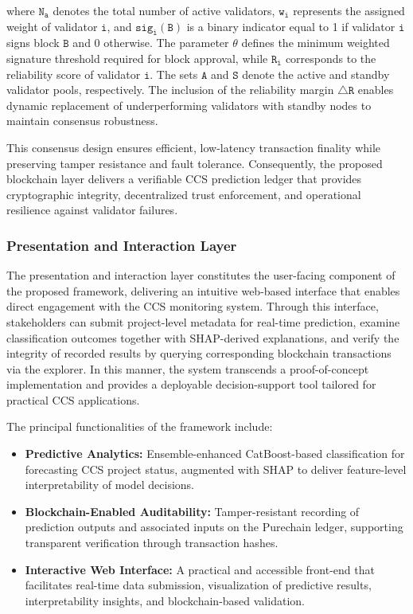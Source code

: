 \documentclass[conference]{IEEEtran}
\begin{document}
\vspace{-0.2cm}
where $\mathtt{N_a}$ denotes the total number of active validators, $\mathtt{w_i}$ represents the assigned weight of validator $\mathtt{i}$, and $\mathtt{sig_i(B)}$ is a binary indicator equal to 1 if validator $\mathtt{i}$ signs block $\mathtt{B}$ and 0 otherwise. The parameter $\mathtt{\theta}$ defines the minimum weighted signature threshold required for block approval, while $\mathtt{R_i}$ corresponds to the reliability score of validator $\mathtt{i}$. The sets $\mathtt{A}$ and $\mathtt{S}$ denote the active and standby validator pools, respectively. The inclusion of the reliability margin $\mathtt{\triangle R}$ enables dynamic replacement of underperforming validators with standby nodes to maintain consensus robustness.

This consensus design ensures efficient, low-latency transaction finality while preserving tamper resistance and fault tolerance. Consequently, the proposed blockchain layer delivers a verifiable CCS prediction ledger that provides cryptographic integrity, decentralized trust enforcement, and operational resilience against validator failures.

\subsubsection{\textbf{Presentation and Interaction Layer}} The presentation and interaction layer constitutes the user-facing component of the proposed framework, delivering an intuitive web-based interface that enables direct engagement with the CCS monitoring system. Through this interface, stakeholders can submit project-level metadata for real-time prediction, examine classification outcomes together with SHAP-derived explanations, and verify the integrity of recorded results by querying corresponding blockchain transactions via the explorer. In this manner, the system transcends a proof-of-concept implementation and provides a deployable decision-support tool tailored for practical CCS applications.

The principal functionalities of the framework include:
\begin{itemize}
    \item \textbf{Predictive Analytics:} Ensemble-enhanced CatBoost-based classification for forecasting CCS project status, augmented with SHAP to deliver feature-level interpretability of model decisions.
    
    \item \textbf{Blockchain-Enabled Auditability:} Tamper-resistant recording of prediction outputs and associated inputs on the Purechain ledger, supporting transparent verification through transaction hashes.
    
    \item \textbf{Interactive Web Interface:} A practical and accessible front-end that facilitates real-time data submission, visualization of predictive results, interpretability insights, and blockchain-based validation.
\end{itemize}
\end{document}
